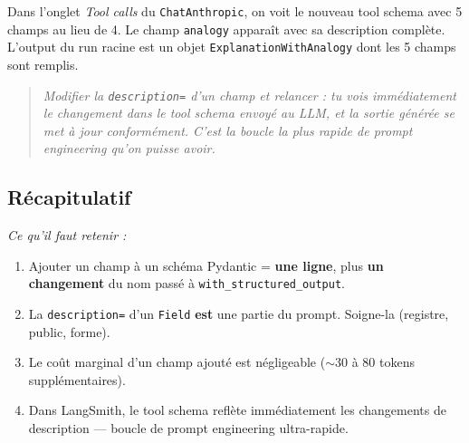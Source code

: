 \documentclass[11pt,a4paper]{article}
\begin{document}
Dans l'onglet \emph{Tool calls} du \texttt{ChatAnthropic}, on voit le
nouveau tool schema avec 5 champs au lieu de 4. Le champ \texttt{analogy}
apparaît avec sa description complète. L'output du run racine est un
objet \texttt{ExplanationWithAnalogy} dont les 5 champs sont remplis.

\begin{center}
\end{center}

\begin{quote}\itshape
Modifier la \texttt{description=} d'un champ et relancer : tu vois
immédiatement le changement dans le tool schema envoyé au LLM, et la
sortie générée se met à jour conformément. C'est la boucle la plus rapide
de prompt engineering qu'on puisse avoir.
\end{quote}

\subsection*{Récapitulatif}
{\itshape\sloppy
\textit{Ce qu'il faut retenir :}
\begin{enumerate}[leftmargin=*]
  \item Ajouter un champ à un schéma Pydantic = \textbf{une ligne}, plus
        \textbf{un changement} du nom passé à \texttt{with\_structured\_output}.
  \item La \texttt{description=} d'un \texttt{Field} \textbf{est} une
        partie du prompt. Soigne-la (registre, public, forme).
  \item Le coût marginal d'un champ ajouté est négligeable ($\sim$30 à
        80 tokens supplémentaires).
  \item Dans LangSmith, le tool schema reflète immédiatement les changements
        de description — boucle de prompt engineering ultra-rapide.
\end{enumerate}
\par}
\end{document}
